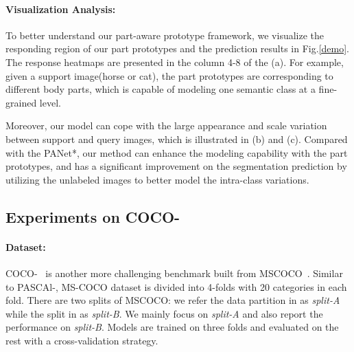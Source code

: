 \documentclass[runningheads]{llncs}
\begin{document}
\paragraph{{\rm\textbf{Visualization Analysis:}}} 
To better understand our part-aware prototype framework, we visualize the responding region of our part prototypes and the prediction results in Fig.\ref{demo}.
The response heatmaps are presented in the column 4-8 of the (a). For example, given a support image(horse or cat), the part prototypes are corresponding to different body parts, which is capable of modeling one semantic class at a fine-grained level.

Moreover, our model can cope with the large appearance and scale variation between support and query images, which is illustrated in (b) and (c). Compared with the PANet*, our method can enhance the modeling capability with the part prototypes, and has a significant improvement on the segmentation prediction by utilizing the unlabeled images to better model the intra-class variations.


\subsection{Experiments on COCO-}\label{sec:coco}
\paragraph{{\rm \textbf{Dataset:}}} COCO-~\cite{wang2019panet,nguyen2019feature} is another more challenging benchmark built from MSCOCO~\cite{lin2014microsoft}. Similar to PASCAl-, MS-COCO dataset is divided into 4-folds with 20 categories in each fold. There are two splits of MSCOCO: we refer the data partition in \cite{wang2019panet} as \textit{split-A} while the split in \cite{nguyen2019feature} as \textit{split-B}. We mainly focus on \textit{split-A} and also report the performance on \textit{split-B}.  Models are trained on three folds and evaluated on the rest with a cross-validation strategy. 
\end{document}
